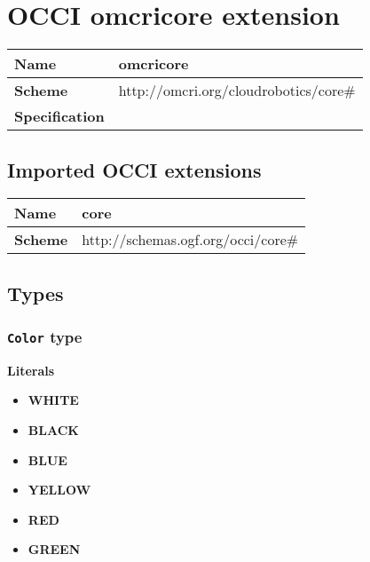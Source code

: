 \section{OCCI omcricore extension}
\begin{center}
\begin{tabular}{|l|l|}
  \hline
  \textbf{Name} & omcricore \\
  \hline  
  \textbf{Scheme} & http://omcri.org/cloudrobotics/core\# \\
  \hline
  \textbf{Specification} &  \\
  \hline
\end{tabular}
\end{center}

\subsection{Imported OCCI extensions}

\begin{center} 
\begin{tabular}{|l|l|}
  \hline
  \textbf{Name} & core \\
  \hline  
  \textbf{Scheme} & http://schemas.ogf.org/occi/core\# \\
  \hline
\end{tabular}
\end{center}


\subsection{Types}
\subsubsection{\texttt{Color} type}

\textbf{Literals}
\begin{itemize}
\item \textbf{WHITE} 
\end{itemize}
\begin{itemize}
\item \textbf{BLACK} 
\end{itemize}
\begin{itemize}
\item \textbf{BLUE} 
\end{itemize}
\begin{itemize}
\item \textbf{YELLOW} 
\end{itemize}
\begin{itemize}
\item \textbf{RED} 
\end{itemize}
\begin{itemize}
\item \textbf{GREEN} 
\end{itemize}

